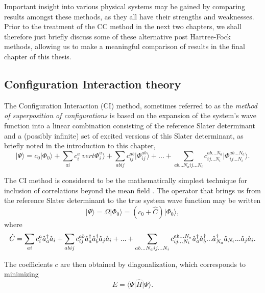 Important insight into various physical systems may be gained by
comparing results amongst these methods, as they all have their
strengths and weaknesses. Prior to the treatment of the CC method in the next two chapters, 
we shall therefore just briefly discuss some of these
alternative post Hartree-Fock methods, allowing us to make a meaningful comparison of
results in the final chapter of this thesis.

\subsection{Configuration Interaction theory}

The Configuration Interaction (CI) method, sometimes referred to as
the \emph{method of superposition of configurations} \cite{Harris} is
based on the expansion of the system's wave function into a linear
combination consisting of the reference Slater determinant and a
(possibly infinite) set of excited versions of this Slater
determinant, as briefly noted in the introduction to this chapter,
\begin{equation}
\vert \Psi \rangle = c_0 \vert \Phi_0 \rangle + \sum_{ai} c^{a}_i\ vert \Phi_i^a \rangle +  \sum_{abij} c^{ab}_{ij} \vert \Phi_{ij}^{ab} \rangle + ... + \sum_{ab...N_a ij...N_i} c^{ab...N_a}_{ij...N_i} \vert \Phi_{ij...N_i}^{ab...N_a} \rangle.
\label{eqn:fullCI}
\end{equation}

The CI method is considered to be the mathematically simplest
technique for inclusion of correlations beyond the mean
field \cite{Harris}. The operator that brings us from the reference
Slater determinant to the true system wave function may be written
\begin{equation}
\vert \Psi \rangle = \Omega \vert  \Phi_0 \rangle = (c_0 + \hat{C}) \vert  \Phi_0 \rangle,
\end{equation}
where
\begin{equation}
\hat{C} = \sum_{ai} c^{a}_i \hat{a}_{a}^\dagger \hat{a}_{i}+  \sum_{abij} c^{ab}_{ij} \hat{a}_{a}^\dagger \hat{a}_{b}^\dagger \hat{a}_{j} \hat{a}_{i} + ... + \sum_{ab...N_a ij...N_i} c^{ab...N_a}_{ij...N_i} \hat{a}_{a}^\dagger \hat{a}_{b}^\dagger ... \hat{a}_{N_a}^\dagger \hat{a}_{N_i} ... \hat{a}_{j} \hat{a}_{i}.
\end{equation}

The coefficients $c$ are then obtained by diagonalization, which corresponds to  minimizing 
\begin{equation}
E = \langle \Psi \vert \hat{H} \vert \Psi \rangle.
\label{eqn:fullCIvar}
\end{equation}

